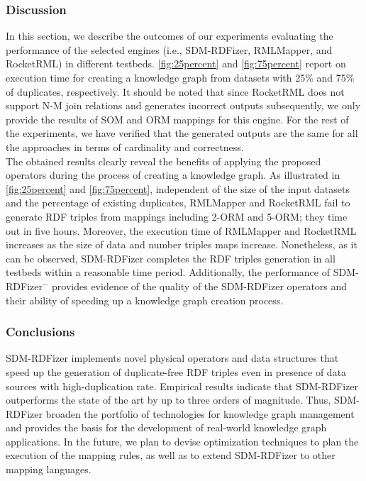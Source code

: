 \subsubsection{Discussion}
In this section, we describe the outcomes of our experiments evaluating the performance of the selected engines (i.e., SDM-RDFizer, RMLMapper, and RocketRML) in different testbeds.
\autoref{fig:25percent} and \autoref{fig:75percent} report on execution time for creating a knowledge graph from datasets with 25\% and 75\% of duplicates, respectively. It should be noted that since RocketRML does not support N-M join relations and generates incorrect outputs subsequently, we only provide the results of SOM and ORM mappings for this engine. For the rest of the experiments, we have verified that the generated outputs are the same for all the approaches in terms of cardinality and correctness.\\
\noindent The obtained results clearly reveal the benefits of applying the proposed operators during the process of creating a knowledge graph. As illustrated in \autoref{fig:25percent} and \autoref{fig:75percent}, independent of the size of the input datasets and the percentage of existing duplicates, RMLMapper and RocketRML fail to generate RDF triples from mappings including 2-ORM and 5-ORM; they time out in five hours. Moreover, the execution time of RMLMapper and RocketRML increases as the size of data and number triples maps increase. Nonetheless, as it can be observed, SDM-RDFizer completes the RDF triples generation in all testbeds within a reasonable time period. Additionally, the performance of SDM-RDFizer$^-$ provides evidence of the quality of the SDM-RDFizer operators and their ability of speeding up a knowledge graph creation process.       


\subsubsection{Conclusions}
SDM-RDFizer implements novel physical operators and data structures that speed up the generation of duplicate-free RDF triples even in presence of data sources with high-duplication rate. Empirical results indicate that SDM-RDFizer outperforms the state of the art by up to three orders of magnitude. Thus, SDM-RDFizer broaden the portfolio of technologies for knowledge graph management and provides the basis for the development of real-world knowledge graph applications. In the future, we plan to devise optimization techniques to plan the execution of the mapping rules, as well as to extend SDM-RDFizer to other mapping languages.
